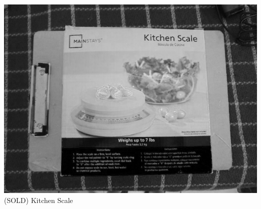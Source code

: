 \documentclass[t]{beamer}
\newcommand{\htarget}[2]{\hypertarget{#1}{#2}}
\begin{document}
\begin{frame}\htarget{scale}{} \begin{center}
\includegraphics[height=0.8\textheight]{kitchen_scale_sold.jpg} \\
(SOLD) Kitchen Scale
\end{center} \end{frame}
\end{document}
